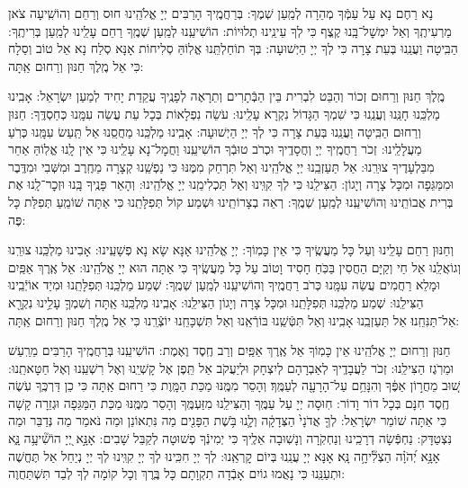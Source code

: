 \documentclass[twoside, openany, parskip=half, 11pt]{book}
\begin{document}
 נָא רַחֶם נָא עַל עַמְּֿךָ מְהֵרָה לְמַֽעַן שְׁמֶךָ: בְּרַחֲמֶֽיךָ הָרַבִּים יְיָ אֱלֹהֵֽינוּ חוּס וְרַחֵם וְהוֹשִֽׁיעָה צֹאן מַרְעִיתֶֽךָ וְאַל יִמְשׇׁל־בָּֽנוּ קֶֽצֶף כִּי לְךָ עֵינֵֽינוּ תְלוּיוֹת: הוֹשִׁיעֵֽנוּ לְמַֽעַן שְׁמֶֽךָ רַחֵם עָלֵֽינוּ לְמַֽעַן בְּרִיתֶֽךָ: הַבִּֽיטָה וַעֲנֵֽנוּ בְּעֵת צָרָה כִּי לְךָ יְיָ הַיְשׁוּעָה: בְּךָ תוֹחַלְתֵּֽנוּ אֱלֽוֹהַּ סְלִיחוֹת אָנָּא סְלַח נָא אֵל טוֹב וְסַלָח כִּי אֵל מֶֽלֶךְ חַנּוּן וְרַחוּם אַֽתָּה:

 מֶֽלֶךְ חַנּוּן וְרַחוּם זְכוֹר וְהַבֵּט לִבְרִית בֵּין הַבְּֿתָרִים וְתֵרָאֶה לְפָנֶֽיךָ עֲקֵדַת יָחִיד לְמַעַן יִשְׂרָאֵל: אָבִֽינוּ מַלְכֵּֽנוּ חָנֵּֽנוּ וְעֲנֵֽנוּ כִּי שִׁמְךָ הַגָּדוֹל נִקְרָא עָלֵֽינוּ: עֹשֵׂה נִפְלָאוֹת בְּכָל עֵת עֲשֵׂה עִמָּֽנוּ כְּחַסְדֶּֽךָ: חַנּוּן וְרַחוּם הַבִּֽיטָה וַעֲנֵֽנוּ בְּעֵת צָרָה כִּי לְךָ יְיָ הַיְשׁוּעָה: אָבִֽינוּ מַלְכֵּֽנוּ מַחֲסֵֽנוּ אַל תַּֽעַשׂ עִמָּֽנוּ כְּרֹֽעַ מַעֲלָלֵֽינוּ: זְכֹר רַחֲמֶֽיךָ יְיָ וְחֲסָדֶֽיךָ וּכְרֹב טוּבְֿךָ הוֹשִׁיעֵֽנוּ וַחֲמׇל־נָא עָלֵֽינוּ כִּי אֵין לָֽנוּ אֱלֽוֹהַּ אַחֵר מִבַּלְעָדֶיךָ צוּרֵֽנוּ: אַל תַּעַזְבֵֽנוּ יְיָ אֱלֹהֵֽינוּ וְאַל תִּרְחַק מִמֶּנּוּ כִּי נַפְשֵֽׁנוּ קְצָרָה מֵחֶֽרֶב וּמִשְּׁבִי וּמִדֶּֽבֶר וּמִמַּגֵּפָה וּמִכָּל צָרָה וְיָגוֹן: הַצִּילֵֽנוּ כִּי לְךָ קִוִּֽינוּ וְאַל תַּכְלִימֵֽנוּ יְיָ אֱלֹהֵֽינוּ: וְהָאֵר פָּנֶֽיךָ בָּֽנוּ וּזְכׇר־לָֽנוּ אֶת בְּרִית אֲבוֹתֵֽינוּ וְהוֹשִׁיעֵֽנוּ לְמַֽעַן שְׁמֶֽךָ: רְאֵה בְצָרוֹתֵֽינוּ וּשְׁמַע קוֹל תְּפִלָּתֵֽנוּ כִּי אַתָּה שׁוֹמֵֽעַ תְּפִלַּת כָּל פֶּה:

 וְחַנּוּן רַחֵם עָלֵֽינוּ וְעַל כָּל מַעֲשֶֽׂיךָ כִּי אֵין כָּמֽוֹךָ: יְיָ אֱלֹהֵֽינוּ אָנָּא שָׂא נָא פְשָׁעֵֽינוּ: אָבִינוּ מַלְכֵּֽנוּ צוּרֵֽנוּ וְגוֹאֲלֵֽנוּ אֵל חַי וְקַיָּם הַחֲסִין בַּכֹּֽחַ חָסִיד וָטוֹב עַל כָּל מַעֲשֶֽׂיךָ כִּי אַתָּה הוּא יְיָ אֱלֹהֵֽינוּ: אֵל אֶֽרֶךְ אַפַּֽיִם וּמָלֵא רַחֲמִים עֲשֵׂה עִמָּֽנוּ כְּרֹב רַחֲמֶֽיךָ וְהוֹשִׁיעֵֽנוּ לְמַֽעַן שְׁמֶֽךָ: שְׁמַע מַלְכֵּֽנוּ תְּפִלָּתֵֽנוּ וּמִיַד אוֹיְֿבֵֽינוּ הַצִּילֵֽנוּ: שְׁמַע מַלְכֵּֽנוּ תְּפִלָּתֵֽנוּ וּמִכָּל צָרָה וְיָגוֹן הַצִּילֵֽנוּ: אָבִֽינוּ מַלְכֵּֽנוּ אַֽתָּה וְשִׁמְךָ֛ עָלֵ֥ינוּ נִקְרָ֖א אַל־תַּנִּחֵֽנוּ׃ אַל תַּעַזְבֵֽנוּ אָבִֽינוּ וְאַל תִּטְּֿשֵֽׁנוּ בּוֹרְֿאֵֽנוּ וְאַל תִּשְׁכָּחֵֽנוּ יוֹצְֿרֵֽנוּ כִּי אֵל מֶֽלֶךְ חַנּוּן וְרַחוּם אַֽתָּה:



 חַנּוּן וְרַחוּם יְיָ אֱלֹהֵֽינוּ אֵין כָּמֽוֹךָ אֵל אֶֽרֶךְ אַפַּֽיִם וְרַב חֶֽסֶד וֶאֶמֶת: הוֹשִׁיעֵֽנוּ בְּרַחֲמֶֽיךָ הָרַבִּים מֵרַֽעַשׁ וּמֵרֹֽגֶז הַצִּילֵֽנוּ: זְכֹר לַעֲבָדֶֽיךָ לְאַבְרָהָם לְיִצְחָק וּלְיַעֲקֹב אַל תֵּֽפֶן אֶל קָשְׁיֵֽנוּ וְאֶל רִשְׁעֵֽנוּ וְאֶל חַטָּאתֵֽנוּ: 
שׁ֚וּב מֵחֲר֣וֹן אַפֶּ֔ךָ וְהִנָּחֵ֥ם עַל־הָרָעָ֖ה לְעַמֶּֽךָ׃ וְהָסֵר מִמֶּֽנּוּ מַכַּת הַמָּֽוֶת כִּי רַחוּם אַֽתָּה כִּי כֵן דַּרְכֶּֽךָ עֹֽשֶׂה חֶֽסֶד חִנָּם בְּכָל דוֹר וָדוֹר: חֽוּסָה יְיָ עַל עַמֶּֽךָ וְהַצִּילֵֽנוּ מִזַּעְמֶּֽךָ וְהָסֵר מִמֶּֽנּוּ מַכַּת הַמַּגֵּפָה וּגְזֵרָה קָשָׁה כִּי אַתָּה שׁוֹמֵר יִשְׂרָאֵל:
לְךָ֤ אֲדֹנָי֙ הַצְּדָקָ֔ה וְלָ֛נוּ בֹּ֥שֶׁת הַפָּנִ֖ים מַה נִּתְאוֹנֵן וּמַה נֹּאמַר מַה נְּדַבֵּר וּמַה נִּצְטַדָּק: נַחְפְּֿשָׂה דְרָכֵֽינוּ וְנַחְקֹֽרָה וְנָשֽׁוּבָה אֵלֶֽיךָ כִּי יְמִינְֿךָ פְשׁוּטָה לְקַבֵּל שָׁבִים:
אָנָּ֣א יְ֭יָ הוֹשִׁ֘יעָ֥ה נָּ֑א אָנָּ֥א יְ֝הֹוָ֗ה הַצְלִ֘יחָ֥ה נָּֽא׃ אָנָּא יְיָ עֲנֵֽנוּ בְּיוֹם קׇרְאֵֽנוּ: לְךָ יְיָ חִכִּֽינוּ לְךָ יְיָ קִוִּֽינוּ לְךָ יְיָ נְיַחֵל אַל תֶּחֱשֶׁה וּתְעַנֵּֽנוּ כִּי נָאֲמוּ גוֹיִם אָבְֿדָה תִקְוָתָם כָּל בֶּֽרֶךְ וְכָל קוֹמָה לְךָ לְבַד תִּשְׁתַּחֲוֶה: 
 
\end{document}
